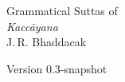\begin{titlepage}
\setcounter{page}{1}
{\noindent\fontsize{26pt}{26pt}\upshape Grammatical Suttas of}\\[2\baselineskip]
{\noindent\fontsize{46pt}{46pt}\itshape Kaccāyana}\\[8\baselineskip]
{\LARGE J.\,R. Bhaddacak}\par
{}
{\noindent\ttfamily Version 0.3-snapshot}
\end{titlepage}
\endinput
